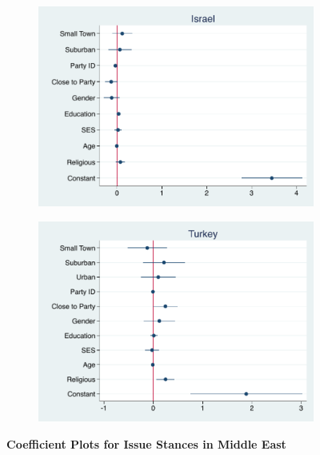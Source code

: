 \documentclass[12pt, titlepage]{article}
\newcommand\tb{\textbf}
\begin{document}
\begin{figure}[H]
	\centering
	\begin{subfigure}[b]{0.475\textwidth}
		\centering
		\includegraphics[width=\textwidth]{LibCoef/Israel}
	\end{subfigure}
	\hfill
	\begin{subfigure}[b]{0.475\textwidth}  
		\centering 
		\includegraphics[width=\textwidth]{LibCoef/Turkey}
	\end{subfigure}
	\caption[ \tb{Issue Stances - Middle East} ]
	{\tb {Coefficient Plots for Issue Stances in Middle East} }
	\label{MidEastLibCoef}
\end{figure}
\end{document}
